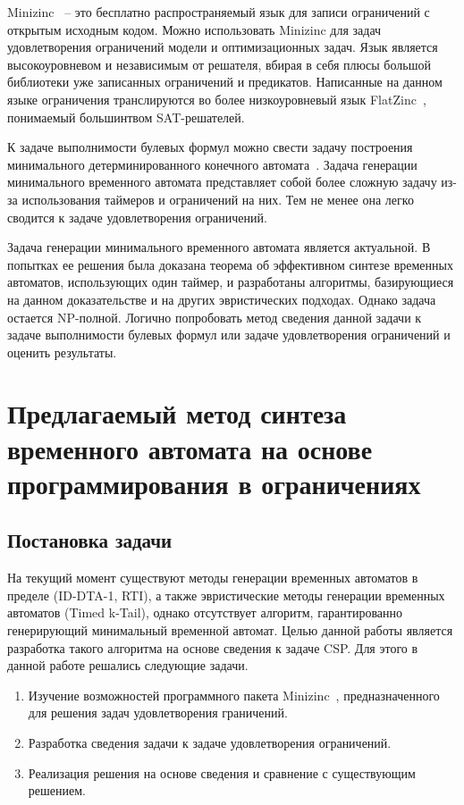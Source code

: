 \documentclass[times,specification,annotation]{itmo-student-thesis}
\begin{document}
Minizinc~\cite{minizinc} -- это бесплатно распространяемый язык для записи ограничений с открытым исходным кодом. Можно использовать Minizinc для задач удовлетворения ограничений 
модели и оптимизационных задач. Язык является высокоуровневом и независимым от решателя, вбирая в себя плюсы большой библиотеки уже записанных ограничений и предикатов. Написанные на данном
языке ограничения транслируются во более низкоуровневый язык FlatZinc~\cite{flatzinc}, понимаемый большинтвом SAT-решателей.

К задаче выполнимости булевых формул можно свести задачу построения минимального детерминированного конечного автомата~\cite{exact-dfa}.
Задача генерации минимального временного автомата представляет собой более сложную задачу из-за использования таймеров и ограничений на них.
Тем не менее она легко сводится к задаче удовлетворения ограничений.

\finishrelatedwork

\chapterconclusion

Задача генерации минимального временного автомата является актуальной. В попытках ее решения была доказана теорема об
эффективном синтезе временных автоматов, использующих один таймер, и разработаны алгоритмы, базирующиеся на данном доказательстве и на других эвристических подходах. 
Однако задача остается NP-полной. Логично попробовать метод сведения данной задачи к задаче выполнимости булевых формул или задаче удовлетворения ограничений
и оценить результаты.

\chapter{Предлагаемый метод синтеза временного автомата на основе программирования в ограничениях}

\section{Постановка задачи}

На текущий момент существуют методы генерации временных автоматов в пределе (ID-DTA-1, RTI), а также эвристические методы генерации временных автоматов (Timed k-Tail), 
однако отсутствует алгоритм, гарантированно генерирующий минимальный временной автомат. Целью данной работы является разработка такого алгоритма на основе сведения к
задаче CSP. Для этого в данной работе решались следующие задачи.

\begin{enumerate}
  \item Изучение возможностей программного пакета Minizinc~\cite{minizinc}, предназначенного для решения задач удовлетворения граничений. 
  \item Разработка сведения задачи к задаче удовлетворения ограничений.
  \item Реализация решения на основе сведения и сравнение с существующим решением.
\end{enumerate}
\end{document}
